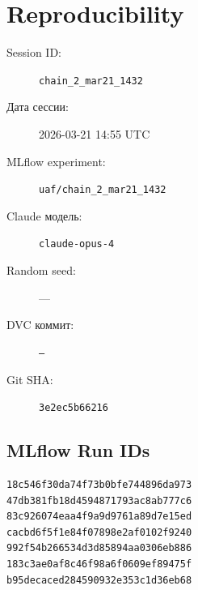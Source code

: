\documentclass[12pt,a4paper]{article}
\begin{document}
\section{Reproducibility}

\begin{description}
    \item[Session ID:] \texttt{chain\_2\_mar21\_1432}
    \item[Дата сессии:] 2026-03-21 14:55 UTC
    \item[MLflow experiment:] \texttt{uaf/chain\_2\_mar21\_1432}
    \item[Claude модель:] \texttt{claude-opus-4}
    \item[Random seed:] ---
    \item[DVC коммит:] \texttt{---}
    \item[Git SHA:] \texttt{3e2ec5b66216}
\end{description}

\subsection*{MLflow Run IDs}

\begin{lstlisting}
18c546f30da74f73b0bfe744896da973
47db381fb18d4594871793ac8ab777c6
83c926074eaa4f9a9d9761a89d7e15ed
cacbd6f5f1e84f07898e2af0102f9240
992f54b266534d3d85894aa0306eb886
183c3ae0af8c46f98a6f0609ef89475f
b95decaced284590932e353c1d36eb68
\end{lstlisting}
\end{document}
